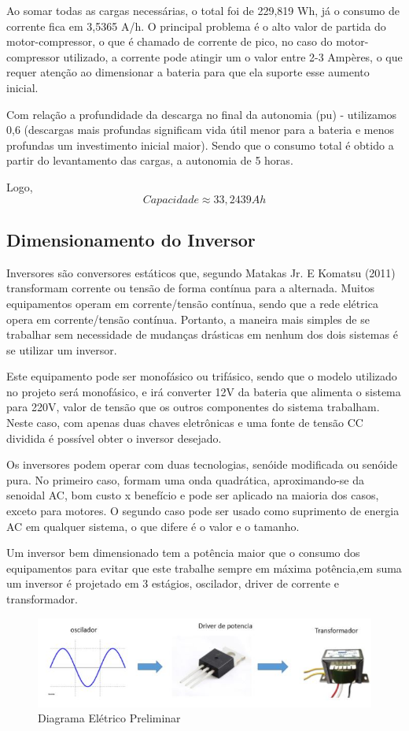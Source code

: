 Ao somar todas as cargas necessárias, o total foi de 229,819 Wh, já o consumo de corrente fica em 3,5365 A/h. O principal problema é o alto valor de partida do motor-compressor, o que é chamado de corrente de pico, no caso do motor-compressor utilizado, a corrente pode atingir um o valor entre 2-3 Ampères, o que requer atenção ao dimensionar a bateria para que ela suporte esse aumento inicial.


Com relação a profundidade da descarga no final da autonomia (pu) - utilizamos 0,6 (descargas mais profundas significam vida útil menor para a bateria e menos profundas um investimento inicial maior). Sendo que o consumo total é obtido a partir do levantamento das cargas, a autonomia de 5 horas.

Logo, 
$$
Capacidade \approx 33,2439 Ah
$$


\subsection{Dimensionamento do Inversor}
Inversores são conversores estáticos que, segundo Matakas Jr. E Komatsu (2011) transformam corrente ou tensão de forma contínua para a alternada. Muitos equipamentos operam em corrente/tensão contínua, sendo que a rede elétrica opera em corrente/tensão contínua. Portanto, a maneira mais simples de se trabalhar sem necessidade de mudanças drásticas em nenhum dos dois sistemas é se utilizar um inversor.

Este equipamento pode ser monofásico ou trifásico, sendo que o modelo utilizado no projeto será monofásico, e irá converter 12V da bateria que alimenta o sistema para 220V, valor de tensão que os outros componentes do sistema trabalham. Neste caso, com apenas duas chaves eletrônicas e uma fonte de tensão CC dividida é possível obter o inversor desejado.

Os inversores podem operar com duas tecnologias, senóide modificada ou senóide pura. No primeiro caso, formam uma onda quadrática, aproximando-se da senoidal AC, bom custo x benefício e pode ser aplicado na maioria dos casos, exceto para motores. O segundo caso pode ser usado como suprimento de energia AC em qualquer sistema, o que difere é o valor e o tamanho.

Um inversor bem dimensionado tem a potência maior que o consumo dos equipamentos para evitar que este trabalhe sempre em máxima potência,em suma um inversor é projetado em 3 estágios, oscilador, driver de corrente e transformador.
\begin{figure}[H]
	\begin{center}
		\includegraphics[scale = 0.75]{figuras/dim_inversor.JPG}
		\caption{ Diagrama Elétrico Preliminar}
	\end{center}
\end{figure}

